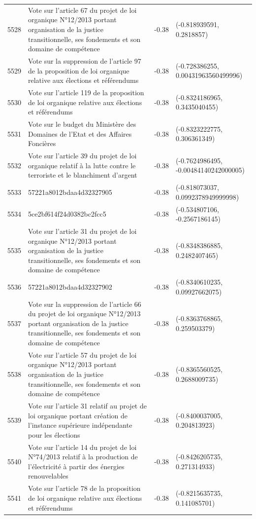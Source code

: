 \begin{table}[ht]
\begin{tabular}{rlrl}
  5528 & Vote sur l'article 67 du projet de loi organique N°12/2013 portant organisation de la justice transitionnelle, ses fondements et son domaine de compétence & -0.38 & (-0.818939591, 0.2818857) \\ 
  5529 & Vote sur la suppression de l'article 97 de la proposition de loi organique relative aux élections et référendums & -0.38 & (-0.728386255, 0.00431963560499996) \\ 
  5530 & Vote sur l'article 119 de la proposition de loi organique relative aux élections et référendums & -0.38 & (-0.8324186965, 0.3435040455) \\ 
  5531 & Vote sur le budget du Ministère des Domaines de l'Etat et des Affaires Foncières & -0.38 & (-0.8323222775, 0.306361349) \\ 
  5532 & Vote sur l'article 39 du projet de loi organique relatif à la lutte contre le terroriste et le blanchiment d'argent & -0.38 & (-0.7624986495, -0.00484140242000005) \\ 
  5533 & 57221a8012bdaa4d32327905 & -0.38 & (-0.818073037, 0.0992378949999998) \\ 
  5534 & 5ce2bf614f24d0382bc2fcc5 & -0.38 & (-0.534807106, -0.2567186145) \\ 
  5535 & Vote sur l'article 31 du projet de loi organique N°12/2013 portant organisation de la justice transitionnelle, ses fondements et son domaine de compétence & -0.38 & (-0.8348386885, 0.2482407465) \\ 
  5536 & 57221a8012bdaa4d32327902 & -0.38 & (-0.8340610235, 0.09927662075) \\ 
  5537 & Vote sur la suppression de l'article 66 du projet de loi organique N°12/2013 portant organisation de la justice transitionnelle, ses fondements et son domaine de compétence & -0.38 & (-0.8363768865, 0.259503379) \\ 
  5538 & Vote sur l'article 57 du projet de loi organique N°12/2013 portant organisation de la justice transitionnelle, ses fondements et son domaine de compétence & -0.38 & (-0.8365560525, 0.2688009735) \\ 
  5539 & Vote sur l'article 31 relatif au projet de loi organique portant création de l'instance supérieure indépendante pour les élections & -0.38 & (-0.8400037005, 0.204813923) \\ 
  5540 & Vote sur l'article 14 du projet de loi N°74/2013 relatif à la production de l'électricité à partir des énergies renouvelables & -0.38 & (-0.8426205735, 0.271314933) \\ 
  5541 & Vote sur l'article 78 de la proposition de loi organique relative aux élections et référendums & -0.38 & (-0.8215635735, 0.141085701) \\ 

\end{tabular}
\end{table}
